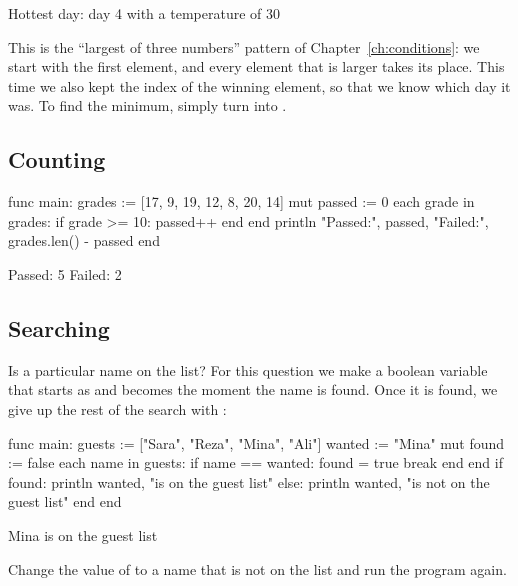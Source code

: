 \begin{salamout}
Hottest day: day 4 with a temperature of 30
\end{salamout}

This is the ``largest of three numbers'' pattern of Chapter~\ref{ch:conditions}: we start with the first element, and every element that
is larger takes its place. This time we also kept the index of the winning
element, so that we know which day it was. To find the minimum, simply turn
\code{>} into \code{<}.

\subsection{Counting}

\begin{salamcode}
func main:
    grades := [17, 9, 19, 12, 8, 20, 14]
    mut passed := 0
    each grade in grades:
        if grade >= 10: passed++ end
    end
    println "Passed:", passed, "Failed:", grades.len() - passed
end
\end{salamcode}

\begin{salamout}
Passed: 5 Failed: 2
\end{salamout}

\subsection{Searching}

Is a particular name on the list? For this question we make a boolean
variable that starts as  and becomes  the moment the
name is found. Once it is found, we give up the rest of the search with
:

\begin{salamcode}
func main:
    guests := ["Sara", "Reza", "Mina", "Ali"]
    wanted := "Mina"
    mut found := false
    each name in guests:
        if name == wanted:
            found = true
            break
        end
    end
    if found:
        println wanted, "is on the guest list"
    else:
        println wanted, "is not on the guest list"
    end
end
\end{salamcode}

\begin{salamout}
Mina is on the guest list
\end{salamout}

Change the value of  to a name that is not on the list and run
the program again.

